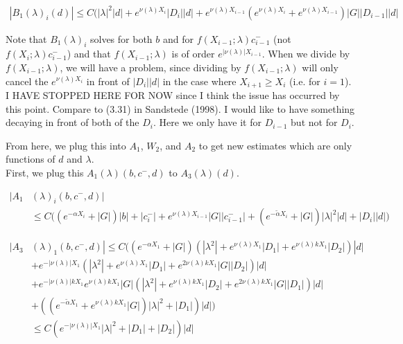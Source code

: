 \documentclass[12pt]{article}
\begin{document}
\begin{enumerate}
\begin{align}
|B_1(\lambda)_i(d)| \leq C(|\lambda|^2 |d| + e^{\nu(\lambda)X_i} |D_i||d|
+ e^{\nu(\lambda)X_{i-1}} (e^{\nu(\lambda)X_i} + e^{\nu(\lambda)X_{i-1}}) |G| |D_{i-1}||d|
\end{align}

Note that $B_1(\lambda)_i$ solves for both $b$ and for $f(X_{i-1}; \lambda) c_{i-1}^-$ (not $f(X_i; \lambda) c_{i-1}^-$) and that $f(X_{i-1}; \lambda)$ is of order $e^{|\nu(\lambda)|X_{i-1}}$. When we divide by $f(X_{i-1}; \lambda)$, we will have a problem, since dividing by $f(X_{i-1}; \lambda)$ will only cancel the $e^{\nu(\lambda)X_i}$ in front of $|D_i||d|$ in the case where $X_{i+1} \geq X_i$ (i.e. for $i = 1$).\\

I HAVE STOPPED HERE FOR NOW since I think the issue has occurred by this point. Compare to (3.31) in Sandstede (1998). I would like to have something decaying in front of both of the $D_i$. Here we only have it for $D_{i-1}$ but not for $D_i$. 

\pagebreak

From here, we plug this into $A_1$, $W_2$, and $A_2$ to get new estimates which are only functions of $d$ and $\lambda$.\\

First, we plug this $A_1(\lambda)(b, c^-, d)$ to $A_3(\lambda)(d)$.

\begin{align*}
|A_1&(\lambda)_i(b, c^-, d)| \\
&\leq C \Big( (e^{-\alpha X_i} + |G|) |b| 
+ |c_i^-| + e^{\nu(\lambda)X_{i-1}} |G||c_{i-1}^-| + (e^{-\tilde{\alpha} X_i} + |G|) |\lambda|^2 |d| + |D_i||d| \Big)
\end{align*} 

\begin{align*}
|A_3&(\lambda)_1(b, c^-, d)| \leq C ((e^{-\alpha X_1} + |G|) (|\lambda^2| + e^{\nu(\lambda) X_1}|D_1| + e^{\nu(\lambda)k X_1}|D_2|)|d| \\
&+ e^{-|\nu(\lambda)| X_1}(|\lambda^2| + e^{\nu(\lambda) X_1}|D_1| + e^{2 \nu(\lambda)k X_1}|G||D_2|)|d| \\
&+ e^{-|\nu(\lambda)| k X_1} e^{\nu(\lambda)k X_1} |G| (|\lambda^2| + e^{\nu(\lambda)k X_1}|D_2| + e^{2 \nu(\lambda)k X_1}|G||D_1|)|d|\\
&+ ((e^{-\tilde{\alpha} X_1} + e^{\nu(\lambda)k X_1} |G|) |\lambda|^2 + |D_1| )|d| ) \\
&\leq C( e^{-|\nu(\lambda)|X_1} |\lambda|^2 + |D_1| + |D_2|) |d| 
\end{align*}


\end{enumerate}
\end{document}
